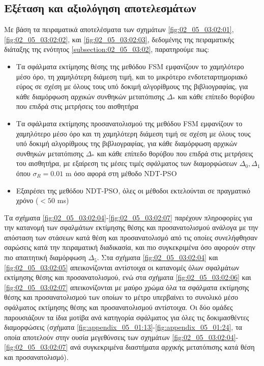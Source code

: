 \subsection{Εξέταση και αξιολόγηση αποτελεσμάτων}
\label{subsection:02_05_03:03}

Με βάση τα πειραματικά αποτελέσματα των σχημάτων \ref{fig:02_05_03:02:01},
\ref{fig:02_05_03:02:02}, και \ref{fig:02_05_03:02:03}, δεδομένης της
πειραματικής διάταξης της ενότητος \ref{subsection:02_05_03:02}, παρατηρούμε
πως:

\begin{itemize}
  \item Τα σφάλματα εκτίμησης θέσης της μεθόδου FSM εμφανίζουν το χαμηλότερο
        μέσο όρο, τη χαμηλότερη διάμεση τιμή, και το μικρότερο
        ενδοτεταρτημοριακό εύρος σε σχέση με όλους τους υπό δοκιμή αλγορίθμους
        της βιβλιογραφίας, για κάθε διαμόρφωση αρχικών συνθηκών μετατόπισης
        $\Delta_\ast$ και κάθε επίπεδο θορύβου που επιδρά στις μετρήσεις του
        αισθητήρα
  \item Τα σφάλματα εκτίμησης προσανατολισμού της μεθόδου FSM εμφανίζουν το
        χαμηλότερο μέσο όρο και τη χαμηλότερη διάμεση τιμή σε σχέση με όλους
        τους υπό δοκιμή αλγορίθμους της βιβλιογραφίας, για κάθε διαμόρφωση
        αρχικών συνθηκών μετατόπισης $\Delta_\ast$ και κάθε επίπεδο θορύβου που
        επιδρά στις μετρήσεις του αισθητήρα, με εξαίρεση τις μέσες τιμές
        σφάλματος των διαμορφώσεων $\Delta_0,\Delta_1$ όπου $\sigma_R = 0.01$ m
        όσο αφορά στη μέθοδο NDT-PSO
  \item Εξαιρέσει της μεθόδου NDT-PSO, όλες οι μέθοδοι εκτελούνται σε πραγματικό
        χρόνο ($< 50$ ms)
\end{itemize}


Τα σχήματα \ref{fig:02_05_03:02:04}-\ref{fig:02_05_03:02:07} παρέχουν
πληροφορίες για την κατανομή των σφαλμάτων εκτίμησης θέσης και προσανατολισμού
ανάλογα με την απόσταση των στάσεων κατά θέση και προσανατολισμό από τις οποίες
συνελήφθησαν σαρώσεις κατά την πειραματική διαδικασία, και πιο συγκεκριμένα όσο
αφορούν στην πιο απαιτητική διαμόρφωση $\Delta_5$. Στα σχήματα
\ref{fig:02_05_03:02:04} και \ref{fig:02_05_03:02:05} απεικονίζονται αντίστοιχα
οι κατανομές όλων σφαλμάτων εκτίμησης θέσης και προσανατολισμού, ενώ στα
σχήματα \ref{fig:02_05_03:02:06} και \ref{fig:02_05_03:02:07} απεικονίζονται με
μαύρο χρώμα όλα τα σφάλματα εκτίμησης θέσης και προσανατολισμού των οποίων το
μέτρο υπερβαίνει το συνολικό μέσο σφάλματος εκτίμησης θέσης και προσανατολισμού
αντίστοιχα. Οι δύο ομάδες παρουσιάζουν τα ίδια μοτίβα ανά κατηγορία σφάλματος
για όλες τις δοκιμασθέντες διαμορφώσεις (σχήματα
\ref{fig:appendix_05_01:13}-\ref{fig:appendix_05_01:24}, τα οποία αποτελούν
στην ουσία μεγεθύνσεις των σχημάτων
\ref{fig:02_05_03:02:04}-\ref{fig:02_05_03:02:07} ανά συγκεκριμένα διαστήματα
αρχικής μετατόπισης κατά θέση και προσανατολισμό).

